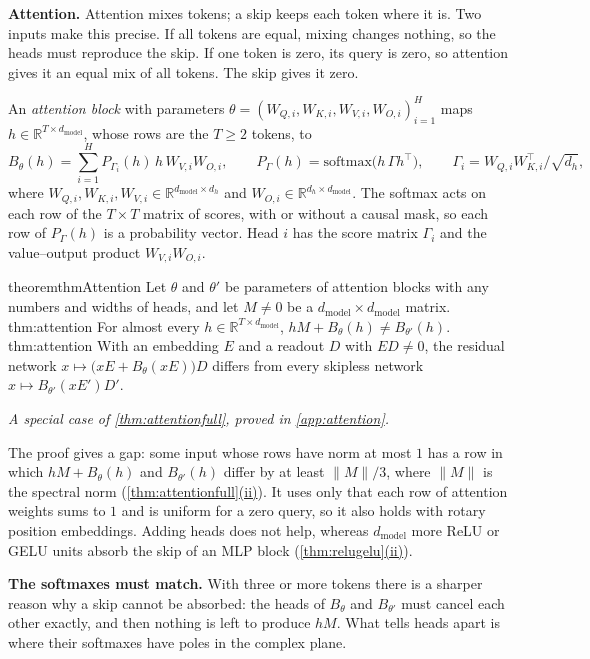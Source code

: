 \documentclass[10pt]{article}
\theoremstyle{definition}
\theoremstyle{remark}
\newcommand{\R}{\mathbb{R}}
\newcommand{\dm}{d_{\mathrm{model}}}
\newcommand{\norm}[1]{\lVert #1\rVert}
\newcommand{\para}[1]{\smallskip\noindent\textbf{#1}\hspace{0.5em}}
\newcommand{\ptlabel}[1]{\phantomsection\label{#1}}
\DeclareRobustCommand{\cpref}[2]{\hyperref[#1:#2]{\cref*{#1}(#2)}}
\newcommand{\specialof}[2]{\par\vspace{-0.4\baselineskip}\noindent\hfill{\small\itshape A special case of \cref{#1}, proved in \cref{#2}.}\par\smallskip}
\newcommand{\stpart}[3]{\ifx\relax#1\relax\else\ptlabel{#1:#2}\fi{\upshape\bfseries\boldmath(#2)\ifx\relax#3\relax\else\ #3.\fi}}
\begin{document}
\para{Attention.} Attention mixes tokens; a skip keeps each token where it is. Two inputs make this precise. If all tokens are equal, mixing changes nothing, so the heads must reproduce the skip. If one token is zero, its query is zero, so attention gives it an equal mix of all tokens. The skip gives it zero.

An \emph{attention block} with parameters $\theta = (W_{Q,i}, W_{K,i}, W_{V,i}, W_{O,i})_{i=1}^{H}$ maps $h \in \R^{T\times\dm}$, whose rows are the $T \ge 2$ tokens, to
\begin{equation}\label{eq:attn}
B_\theta(h) = \sum_{i=1}^{H} P_{\Gamma_i}(h)\, h\, W_{V,i} W_{O,i}, \qquad P_\Gamma(h) = \mathrm{softmax}\big(h\, \Gamma h^\top\big), \qquad \Gamma_i = W_{Q,i} W_{K,i}^\top/\sqrt{d_h},
\end{equation}
where $W_{Q,i}, W_{K,i}, W_{V,i} \in \R^{\dm\times d_h}$ and $W_{O,i} \in \R^{d_h\times\dm}$. The softmax acts on each row of the $T\times T$ matrix of scores, with or without a causal mask, so each row of $P_\Gamma(h)$ is a probability vector. Head $i$ has the score matrix $\Gamma_i$ and the value--output product $W_{V,i}W_{O,i}$.

\begin{restatable}{theorem}{thmAttention}\label{thm:attention}
Let $\theta$ and $\theta'$ be parameters of attention blocks with any numbers and widths of heads, and let $M \neq 0$ be a $\dm\times\dm$ matrix.\\
\stpart{thm:attention}{i}{} For almost every $h \in \R^{T\times\dm}$, $hM + B_\theta(h) \neq B_{\theta'}(h)$.\\
\stpart{thm:attention}{ii}{} With an embedding $E$ and a readout $D$ with $ED \neq 0$, the residual network $x \mapsto \big(xE + B_\theta(xE)\big)D$ differs from every skipless network $x \mapsto B_{\theta'}(xE')D'$.
\end{restatable}
\specialof{thm:attentionfull}{app:attention}

The proof gives a gap: some input whose rows have norm at most $1$ has a row in which $hM + B_\theta(h)$ and $B_{\theta'}(h)$ differ by at least $\norm{M}/3$, where $\norm{M}$ is the spectral norm (\cpref{thm:attentionfull}{ii}). It uses only that each row of attention weights sums to $1$ and is uniform for a zero query, so it also holds with rotary position embeddings. Adding heads does not help, whereas $\dm$ more ReLU or GELU units absorb the skip of an MLP block (\cpref{thm:relugelu}{ii}).

\para{The softmaxes must match.} With three or more tokens there is a sharper reason why a skip cannot be absorbed: the heads of $B_\theta$ and $B_{\theta'}$ must cancel each other exactly, and then nothing is left to produce $hM$. What tells heads apart is where their softmaxes have poles in the complex plane.
\end{document}
